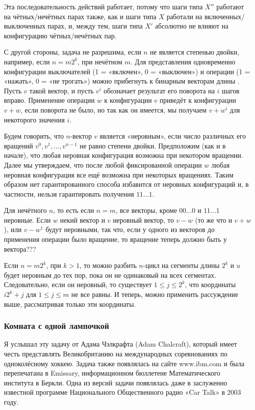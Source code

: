 Эта последовательность действий работает, потому что шаги типа $X''$ работают на чётных/нечётных парах также, как и шаги типа $X$ работали на включенных/выключенных парах, и, между тем, шаги типа $X'$ абсолютно не влияют на конфигурацию чётных/нечётных пар.
\heart

С другой стороны, задача не разрешима, если $n$ не является степенью двойки, например, если $n=m2^k$, при нечётном $m$.
Для представления одновременно конфигурации выключателей (1 = «включен», 0 = «выключен») и операции (1 = «нажать», 0 = «не трогать») можно прибегнуть к бинарным векторам длины .
Пусть $v$ такой вектор, и пусть $v^i$ обозначает результат его поворота на $i$ шагов вправо.
Применение операции $w$ к конфигурации $v$ приведёт к конфигурации $v+w$, если поворота не было, но так как он имеется, мы получаем $v+w^i$ для некоторого значения $i$.

Будем говорить, что $n$-вектор $v$ является «неровным», %
если число различных его вращений $v^0,v^1,\dots,v^{n-1}$ не равно степени двойки.
Предположим (как и в начале), что любая неровная конфигурация возможна при некотором вращении.
Далее мы утверждаем, что после любой фиксированной операции $w$ любая неровная конфигурация все ещё возможна при некоторых вращениях.
Таким образом нет гарантированного способа избавится от неровных конфигураций и, в частности, нельзя гарантировать получения $11\dots1$.

Для нечётного $n$, то есть если $n=m$, все векторы, кроме $00\dots0$ и $11\dots1$ неровные.
Если $w$ некий вектор и $v$ неровный вектор, то $v-w$ (то же что и $v+w$), или $v-w^1$ будут неровными, так что, если у одного из векторов до применения операции было вращение, то вращение теперь должно быть у вектора???

Если $n=m2^k$, при $k>1$, то можно разбить $n$-цикл на сегменты длины $2^k$ и $u$ будет неровным до тех пор, пока он не одинаковый на всех сегментах.
Следовательно, если он неровный, то существует $1\le j\le 2^k$, что координаты $i2^k+j$ для $1\le j\le m$ не все равны.
И теперь, можно применить рассуждение выше, рассматривая только эти координаты.

\subsubsection*{Комната с одной лампочкой}%

Я услышал эту задачу от Адама Чэлкрафта (Adam Chalcraft), который имеет честь представлять Великобританию на международных соревнованиях по одноколёсному хоккею.
Задача также появлялась на сайте www.ibm.com и была перепечатана в Emissary, информационном бюллетене Математического института в Беркли. %
Одна из версий задачи появлялась даже в заслуженно известной программе Национального Общественного радио «Car Talk» в 2003 году.

